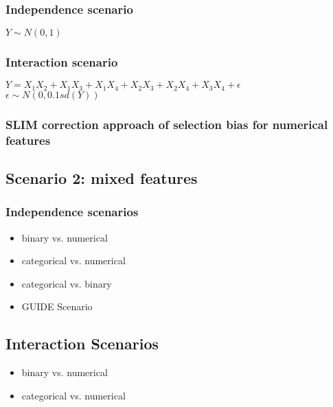 \subsubsection{Independence scenario}
$Y \sim N(0,1)$
\subsubsection{Interaction scenario}
$Y = X_1X_2 + X_1X_3 + X_1X_4 + X_2X_3 + X_2X_4 + X_3X_4 + \epsilon$ \\
$\epsilon \sim N(0,0.1sd(Y))$


\subsubsection{SLIM correction approach of selection bias for numerical features}

\subsection{Scenario 2: mixed features}
\subsubsection{Independence scenarios}
\begin{itemize}
    \item binary vs. numerical
    \item categorical vs. numerical
    \item categorical vs. binary
    \item GUIDE Scenario
\end{itemize}

\subsection{Interaction Scenarios}
\begin{itemize}
    \item binary vs. numerical
    \item categorical vs. numerical
\end{itemize}



